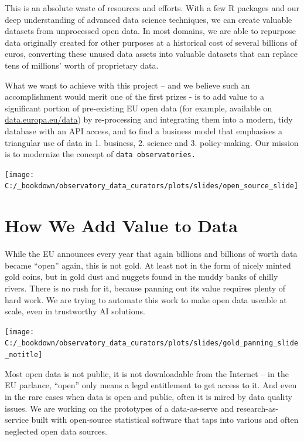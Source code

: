 \documentclass[
  a4paper,
  openany, a4paper, oneside]{book}
\begin{document}
This is an absolute waste of resources and efforts. With a few R packages and our deep understanding of advanced data science techniques, we can create valuable datasets from unprocessed open data. In most domains, we are able to repurpose data originally created for other purposes at a historical cost of several billions of euros, converting these unused data assets into valuable datasets that can replace tens of millions' worth of proprietary data.

What we want to achieve with this project -- and we believe such an accomplishment would merit one of the first prizes - is to add value to a significant portion of pre-existing EU open data (for example, available on \href{https://data.europa.eu/data/}{data.europa.eu/data}) by re-processing and integrating them into a modern, tidy database with an API access, and to find a business model that emphasises a triangular use of data in 1. business, 2. science and 3. policy-making. Our mission is to modernize the concept of \texttt{data\ observatories.}

\begin{center}\texttt{[image: C:/\_bookdown/observatory\_data\_curators/plots/slides/open\_source\_slide]} \end{center}

\hypertarget{add-value}{%
\section{How We Add Value to Data}\label{add-value}}

While the EU announces every year that again billions and billions of worth data became ``open'' again, this is not gold. At least not in the form of nicely minted gold coins, but in gold dust and nuggets found in the muddy banks of chilly rivers. There is no rush for it, because panning out its value requires plenty of hard work. We are trying to automate this work to make open data useable at scale, even in trustworthy AI solutions.

\begin{center}\texttt{[image: C:/\_bookdown/observatory\_data\_curators/plots/slides/gold\_panning\_slide\_notitle]} \end{center}

Most open data is not public, it is not downloadable from the Internet -- in the EU parlance, ``open'' only means a legal entitlement to get access to it. And even in the rare cases when data is open and public, often it is mired by data quality issues. We are working on the prototypes of a data-as-serve and research-as-service built with open-source statistical software that taps into various and often neglected open data sources.
\end{document}
